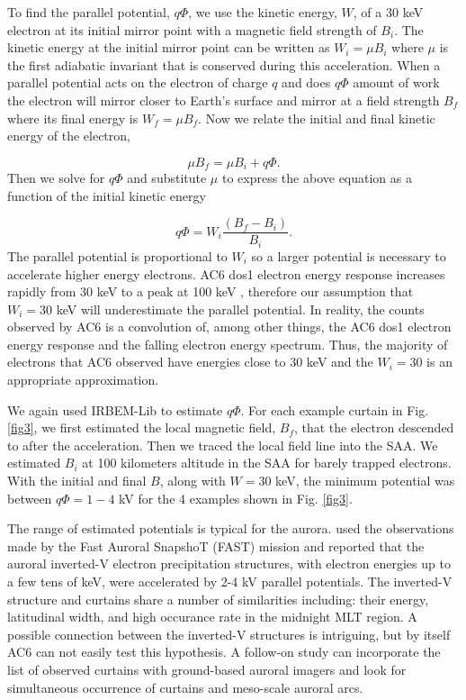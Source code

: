 \documentclass[draft]{agujournal2019}
\begin{document}
To find the parallel potential, $q \Phi$,  we use the kinetic energy, $W$, of a $30$ keV electron at its initial mirror point with a magnetic field strength of $B_i$. The kinetic energy at the initial mirror point can be written as $W_i = \mu B_i$ where $\mu$ is the first adiabatic invariant that is conserved during this acceleration. When a parallel potential acts on the electron of charge $q$ and does $q \Phi$ amount of work the electron will mirror closer to Earth's surface and mirror at a field strength $B_f$ where its final energy is $W_f = \mu B_f$. Now we relate the initial and final kinetic energy of the electron,

\begin{equation}
\mu B_f = \mu B_i + q \Phi.
\end{equation} Then we solve for $q \Phi$ and substitute $\mu$ to express the above equation as a function of the initial kinetic energy 

\begin{equation}
 q \Phi = W_i \frac{(B_f - B_i)}{B_i}.
\end{equation} The parallel potential is proportional to $W_i$ so a larger potential is necessary to accelerate higher energy electrons. AC6 dos1 electron energy response increases rapidly from 30 keV to a peak at 100 keV \cite[Figure 2]{O'brien2019}, therefore our assumption that $W_i = 30$ keV will underestimate the parallel potential. In reality, the counts observed by AC6 is a convolution of, among other things, the AC6 dos1 electron energy response and the falling electron energy spectrum. Thus, the majority of electrons that AC6 observed have energies close to 30 keV and the $W_i = 30$ is an appropriate approximation.

We again used IRBEM-Lib to estimate $ q \Phi$. For each example curtain in Fig. \ref{fig3}, we first estimated the local magnetic field, $B_f$, that the electron descended to after the acceleration. Then we traced the local field line into the SAA. We estimated $B_i$ at 100 kilometers altitude in the SAA for barely trapped electrons. With the initial and final $B$, along with $W = 30$ keV, the minimum potential was between $q \Phi = 1-4$ kV for the 4 examples shown in Fig. \ref{fig3}. 

The range of estimated potentials is typical for the aurora.  used the observations made by the Fast Auroral SnapshoT (FAST) mission and reported that the auroral inverted-V electron precipitation structures, with electron energies up to a few tens of keV, were accelerated by 2-4 kV parallel potentials. The inverted-V structure and curtains share a number of similarities including: their energy, latitudinal width, and high occurance rate in the midnight MLT region. A possible connection between the inverted-V structures is intriguing, but by itself AC6 can not easily test this hypothesis. A follow-on study can incorporate the list of observed curtains with ground-based auroral imagers and look for simultaneous occurrence of curtains and meso-scale auroral arcs.
\end{document}
